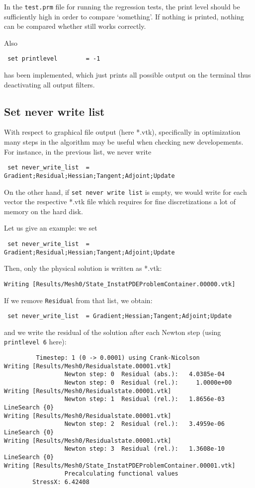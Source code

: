 \begin{remark}
In the \texttt{test.prm} file for running the regression tests, the print
level 
should be sufficiently high in order to compare `something'. If nothing 
is printed, nothing can be compared whether \dope{} still works correctly.
\end{remark}

\begin{remark}
Also
\begin{verbatim}
 set printlevel        = -1
\end{verbatim}
has been implemented, which just prints all possible output on the terminal
thus deactivating all output filters.
\end{remark}


\subsection{Set never write list}
With respect to graphical file output (here *.vtk), specifically in
optimization many steps in the algorithm may be useful when checking 
new developements. For instance, in the previous list, we never write 
\begin{verbatim}
 set never_write_list  = Gradient;Residual;Hessian;Tangent;Adjoint;Update
\end{verbatim}
On the other hand, if \texttt{set never write list} is empty, 
we would write for each vector the respective *.vtk file
which requires for fine discretizations a lot of memory on the hard disk.

Let us give an example: we set 
\begin{verbatim}
 set never_write_list  = Gradient;Residual;Hessian;Tangent;Adjoint;Update
\end{verbatim}
Then, only the physical solution is written as *.vtk:
\begin{verbatim}
Writing [Results/Mesh0/State_InstatPDEProblemContainer.00000.vtk]
\end{verbatim}
If we remove \texttt{Residual} from that list, we obtain:
\begin{verbatim}
 set never_write_list  = Gradient;Hessian;Tangent;Adjoint;Update
\end{verbatim}
and we write the residual of the solution after each Newton step (using
\texttt{printlevel 6} here):
\begin{verbatim}
         Timestep: 1 (0 -> 0.0001) using Crank-Nicolson
Writing [Results/Mesh0/Residualstate.00001.vtk]
                 Newton step: 0  Residual (abs.):   4.0385e-04
                 Newton step: 0  Residual (rel.):     1.0000e+00
Writing [Results/Mesh0/Residualstate.00001.vtk]
                 Newton step: 1  Residual (rel.):   1.8656e-03   LineSearch {0} 
Writing [Results/Mesh0/Residualstate.00001.vtk]
                 Newton step: 2  Residual (rel.):   3.4959e-06   LineSearch {0} 
Writing [Results/Mesh0/Residualstate.00001.vtk]
                 Newton step: 3  Residual (rel.):   1.3608e-10   LineSearch {0} 
Writing [Results/Mesh0/State_InstatPDEProblemContainer.00001.vtk]
                 Precalculating functional values 
        StressX: 6.42408
\end{verbatim}

